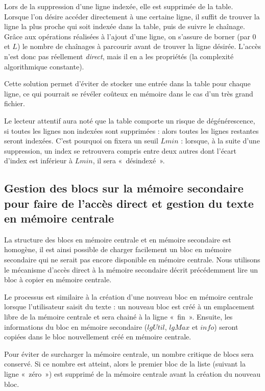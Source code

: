 Lors de la suppression d'une ligne indexée, elle est supprimée de la table.\\

Lorsque l'on désire accéder directement à une certaine ligne, il suffit de trouver la ligne la plus proche qui soit indexée dans la table, puis de suivre le chaînage. Grâce aux opérations réalisées à l'ajout d'une ligne, on s'assure de borner (par $0$ et $L$) le nombre de chaînages à parcourir avant de trouver la ligne désirée. L'accès n'est donc pas réellement \emph{direct}, mais il en a les propriétés (la complexité algorithmique constante).

Cette solution permet d'éviter de stocker une entrée dans la table pour chaque ligne, ce qui pourrait se révéler coûteux en mémoire dans le cas d'un très grand fichier. 

Le lecteur attentif aura noté que la table comporte un risque de dégénérescence, si toutes les lignes non indexées sont supprimées : alors toutes les lignes restantes seront indexées. C'est pourquoi on fixera un seuil $Lmin$ : lorsque, à la suite d'une suppression, un index se retrouvera compris entre deux autres dont l'écart d'index est inférieur à $Lmin$, il sera «~désindexé~». 


\subsection{Gestion des blocs sur la mémoire secondaire pour faire de l'accès
    direct et gestion du texte en mémoire centrale}
	\label{subsec:gestionblocs}

La structure des blocs en mémoire centrale et en mémoire secondaire est
homogène, il est ainsi possible de charger facilement un bloc en mémoire
secondaire qui ne serait pas encore disponible en mémoire centrale. Nous
utilisons le mécanisme d'accès direct à la mémoire secondaire décrit
précédemment lire un bloc à copier en mémoire centrale.

Le processus est similaire à la création d'une nouveau bloc en mémoire centrale
lorsque l'utilisateur saisit du texte : un nouveau bloc est créé à un
emplacement libre de la mémoire centrale et sera chainé à la ligne «~fin~».
Ensuite, les informations du bloc en mémoire secondaire ($lgUtil$, $lgMax$ et
$info$) seront copiées dans le bloc nouvellement créé en mémoire centrale.

Pour éviter de surcharger la mémoire centrale, un nombre critique de blocs sera
conservé. Si ce nombre est atteint, alors le premier bloc de la liste (suivant
la ligne «~zéro~») est supprimé de la mémoire centrale avant la création du
nouveau bloc.

